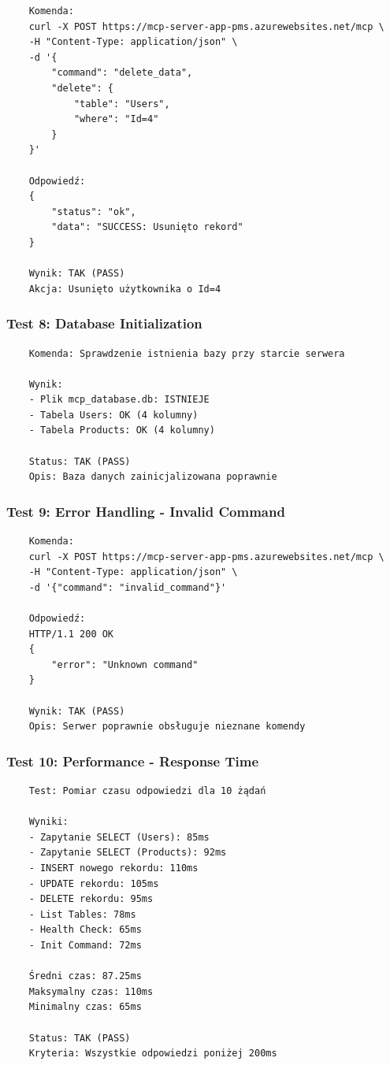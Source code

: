 \documentclass[twoside]{article}
\begin{document}
\begin{verbatim}
	Komenda:
	curl -X POST https://mcp-server-app-pms.azurewebsites.net/mcp \
	-H "Content-Type: application/json" \
	-d '{
		"command": "delete_data",
		"delete": {
			"table": "Users",
			"where": "Id=4"
		}
	}'
	
	Odpowiedź:
	{
		"status": "ok",
		"data": "SUCCESS: Usunięto rekord"
	}
	
	Wynik: TAK (PASS)
	Akcja: Usunięto użytkownika o Id=4
\end{verbatim}

\subsubsection{Test 8: Database Initialization}

\begin{verbatim}
	Komenda: Sprawdzenie istnienia bazy przy starcie serwera
	
	Wynik:
	- Plik mcp_database.db: ISTNIEJE
	- Tabela Users: OK (4 kolumny)
	- Tabela Products: OK (4 kolumny)
	
	Status: TAK (PASS)
	Opis: Baza danych zainicjalizowana poprawnie
\end{verbatim}

\subsubsection{Test 9: Error Handling - Invalid Command}

\begin{verbatim}
	Komenda:
	curl -X POST https://mcp-server-app-pms.azurewebsites.net/mcp \
	-H "Content-Type: application/json" \
	-d '{"command": "invalid_command"}'
	
	Odpowiedź:
	HTTP/1.1 200 OK
	{
		"error": "Unknown command"
	}
	
	Wynik: TAK (PASS)
	Opis: Serwer poprawnie obsługuje nieznane komendy
\end{verbatim}

\subsubsection{Test 10: Performance - Response Time}

\begin{verbatim}
	Test: Pomiar czasu odpowiedzi dla 10 żądań
	
	Wyniki:
	- Zapytanie SELECT (Users): 85ms
	- Zapytanie SELECT (Products): 92ms
	- INSERT nowego rekordu: 110ms
	- UPDATE rekordu: 105ms
	- DELETE rekordu: 95ms
	- List Tables: 78ms
	- Health Check: 65ms
	- Init Command: 72ms
	
	Średni czas: 87.25ms
	Maksymalny czas: 110ms
	Minimalny czas: 65ms
	
	Status: TAK (PASS)
	Kryteria: Wszystkie odpowiedzi poniżej 200ms
\end{verbatim}
\end{document}
